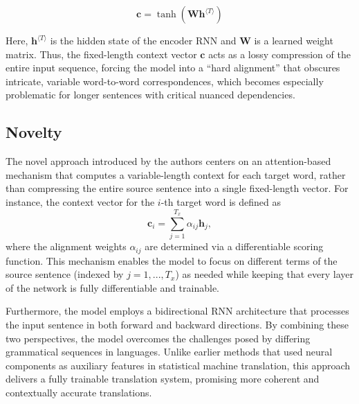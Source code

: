 \documentclass[10pt]{article}
\begin{document}
\[
    \mathbf{c}= \tanh(\mathbf{W}\mathbf{h}^{\langle T \rangle})
\]

Here, \(\mathbf{h}^{\langle T \rangle}\) is the hidden state of the encoder RNN and \(\mathbf{W}\) is a learned weight matrix. Thus, the fixed-length context vector \(\mathbf{c}\) acts as a lossy compression of the entire input sequence, forcing the model into a ``hard alignment'' that obscures intricate, variable word-to-word correspondences, which becomes especially problematic for longer sentences with critical nuanced dependencies.


\subsection*{Novelty}
The novel approach introduced by the authors centers on an attention-based mechanism that computes a variable-length context for each target word, rather than compressing the entire source sentence into a single fixed-length vector. For instance, the context vector for the $i$-th target word is defined as
\[
    \mathbf{c}_i = \sum_{j=1}^{T_x} \alpha_{ij} \mathbf{h}_j,
\]
where the alignment weights $\alpha_{ij}$ are determined via a differentiable scoring function. This mechanism enables the model to focus on different terms of the source sentence (indexed by \(j=1, ..., T_x\)) as needed while keeping that every layer of the network is fully differentiable and trainable.

Furthermore, the model employs a bidirectional RNN architecture that processes the input sentence in both forward and backward directions. By combining these two perspectives, the model overcomes the challenges posed by differing grammatical sequences in languages. Unlike earlier methods that used neural components as auxiliary features in statistical machine translation, this approach delivers a fully trainable translation system, promising more coherent and contextually accurate translations.

\end{document}
